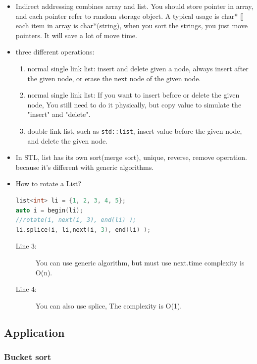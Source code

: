 \documentclass[a4paper,11pt,twoside]{book}
\begin{document}
\begin{itemize}
\item Indirect addressing combines array and list. You should store pointer in array, and each pointer refer to random storage object. A typical usage is char* [] each item in array is char*(string), when you sort the strings, you just move pointers. It will save a lot of move time.  

\item three different operations:
\begin{enumerate}
	\item normal single link list: insert and delete given a node, always insert after the given node, or erase the next node of the given node. 
	
	\item normal single link list: If you want to insert before or delete the given node, You still need to do it physically, but copy value to simulate the "insert" and "delete". 
	
	\item double link list, such as \texttt{std::list}, insert value before the given node, and delete the given node. 
\end{enumerate}

\item In STL, list has its own sort(merge sort), unique, reverse, remove operation. because it's different with generic algorithms. 

\item How to rotate a List?

\begin{lstlisting}[frame=single, language=c++]
list<int> li = {1, 2, 3, 4, 5};
auto i = begin(li);
//rotate(i, next(i, 3), end(li) );
li.splice(i, li,next(i, 3), end(li) );
\end{lstlisting}
\begin{description}
	\item[Line 3:] You can use generic algorithm, but must use next.time complexity is O(n).
	\item[Line 4:] You can also use splice, The complexity is O(1).
\end{description}

\end{itemize} 

\subsection{Application}
\subsubsection{Bucket sort}
\end{document}
